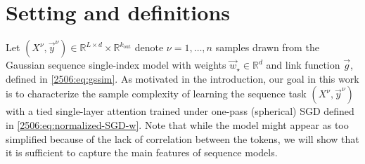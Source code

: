 \section{Setting and definitions}
\label{2506:sec:setting}

Let $(X^{\nu},\vec{y}^{\nu})\in\mathbb{R}^{L\times d}\times \mathbb{R}^{k_\mathrm{out}}$ denote $\nu=1,\dots,n$ samples drawn from the Gaussian sequence single-index model with weights $\vec{w}_{\star}\in\mathbb{R}^{d}$ and link function $\vec{g}$, defined in \cref{2506:eq:gssim}. As motivated in the introduction, our goal in this work is to characterize the sample complexity of learning the sequence task $(X^{\nu},\vec{y}^{\nu})$ with a tied single-layer attention trained under one-pass (spherical) SGD defined in \cref{2506:eq:normalized-SGD-w}. Note that while the model might appear as too simplified because of the lack of correlation between the tokens, we will show that it is sufficient to capture the main features of sequence models. 


